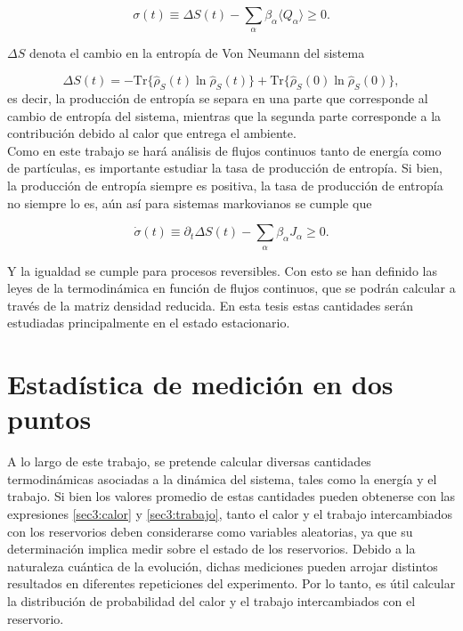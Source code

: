 \begin{equation*}
    \sigma(t) \equiv \Delta S(t) - \sum_{\alpha}\beta_{\alpha}\langle Q_{\alpha}\rangle \geq 0.
\end{equation*}

$\Delta S$ denota el cambio en la entropía de Von Neumann del sistema

\begin{equation*}
    \Delta S(t) = -  \text{Tr}\{\hat{\rho}_{S}(t)\ln \hat{\rho}_{S}(t) \} +  \text{Tr}\{ \hat{\rho}_{S}(0)\ln \hat{\rho}_{S}(0) \},
\end{equation*}
es decir, la producción de entropía se separa en una parte que corresponde al cambio de entropía del sistema, mientras que la segunda parte corresponde a la contribución debido al calor que entrega el ambiente.\\
Como en este trabajo se hará análisis de flujos continuos tanto de energía como de partículas, es importante estudiar la tasa de producción de entropía. Si bien, la producción de entropía siempre es positiva, la tasa de producción de entropía no siempre lo es, aún así para sistemas markovianos se cumple que \cite{strasberg2019non}

\begin{equation*}
    \dot{\sigma}(t) \equiv \partial_{t}\Delta S(t) - \sum_{\alpha}\beta_{\alpha}J_{\alpha} \geq 0.
\end{equation*}

Y la igualdad se cumple para procesos reversibles. Con esto se han definido las leyes de la termodinámica en función de flujos continuos, que se podrán calcular a través de la matriz densidad reducida. En esta tesis estas cantidades serán estudiadas principalmente en el estado estacionario.

\label{sec3sub:leyestermo}

\section{Estadística de medición en dos puntos}
A lo largo de este trabajo, se pretende calcular diversas cantidades termodinámicas asociadas a la dinámica del sistema, tales como la energía y el trabajo. Si bien los valores promedio de estas cantidades pueden obtenerse con las expresiones \ref{sec3:calor} y \ref{sec3:trabajo}, tanto el calor y el trabajo intercambiados con los reservorios deben considerarse como variables aleatorias, ya que su determinación implica medir sobre el estado de los reservorios. Debido a la naturaleza cuántica de la evolución, dichas mediciones pueden arrojar distintos resultados en diferentes repeticiones del experimento. Por lo tanto, es útil calcular la distribución de probabilidad del calor y el trabajo intercambiados con el reservorio.

